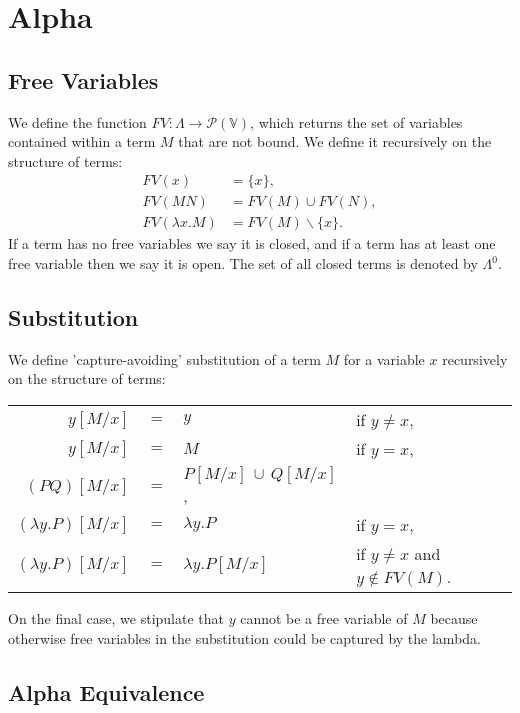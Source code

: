 \section{Alpha}

\subsection{Free Variables}

We define the function $FV : \Lambda \to \mathcal{P}(\mathbb{V})$,
which returns the set of variables contained within a term $M$ that
are not bound. We define it recursively on the structure of terms: 
\begin{align*}
    FV(x) &= \{x\}, \\
    FV(MN) &= FV(M) \cup FV(N), \\
    FV(\lambda x.M) &= FV(M) \backslash \{x\}.
\end{align*} If a term has no free variables we say it is closed,
and if a term has at least one free variable then we say it is open.
The set of all closed terms is denoted by $\Lambda^0$.

\subsection{Substitution}

We define 'capture-avoiding' substitution of a term $M$ for a variable $x$
recursively on the structure of terms: \begin{center}
    \begin{tabular}{ r c l l }
        $y[M/x]$             & $=$ & $y$                        & if $y \neq x$, \\
        $y[M/x]$             & $=$ & $M$                        & if $y = x$, \\
        $(PQ)[M/x]$          & $=$ & $P[M/x] \, \cup \, Q[M/x]$, & \\
        $(\lambda y.P)[M/x]$ & $=$ & $\lambda y.P$              & if $y = x$, \\
        $(\lambda y.P)[M/x]$ & $=$ & $\lambda y.P[M/x]$         & if $y \neq x$ and $y \notin FV(M)$.
    \end{tabular} 
\end{center} On the final case, we stipulate that $y$ cannot be a free variable of
$M$ because otherwise free variables in the substitution could be captured by
the lambda.

\subsection{Alpha Equivalence}

